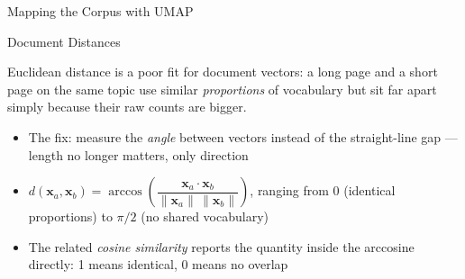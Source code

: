 \documentclass[8pt,aspectratio=169]{beamer}
\begin{document}
\begin{rightframe}{Mapping the Corpus with UMAP}
\end{rightframe}

\begin{textframe}{Document Distances}

Euclidean distance is a poor fit for document vectors: a long page and a short page on the same topic use similar \textit{proportions} of vocabulary but sit far apart simply because their raw counts are bigger.

\begin{itemize}
\item The fix: measure the \textit{angle} between vectors instead of the straight-line gap --- length no longer matters, only direction
\item $d(\mathbf{x}_a,\mathbf{x}_b) = \arccos\!\left(\dfrac{\mathbf{x}_a \cdot \mathbf{x}_b}{\lVert\mathbf{x}_a\rVert\,\lVert\mathbf{x}_b\rVert}\right)$, ranging from 0 (identical proportions) to $\pi/2$ (no shared vocabulary)
\item The related \textit{cosine similarity} reports the quantity inside the arccosine directly: 1 means identical, 0 means no overlap
\end{itemize}

\end{textframe}
\end{document}
